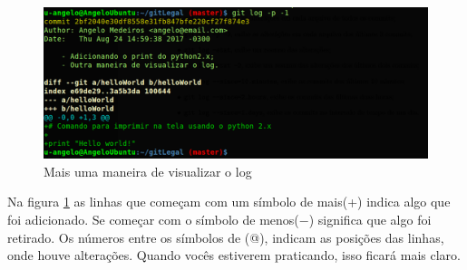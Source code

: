 \documentclass[12pt,openright,oneside,a4paper,english,brazil]{abntex2}
\begin{document}
\begin{figure}[H]
	\caption{\label{logp}Mais uma maneira de visualizar o log}
	\begin{center}
		\includegraphics[width=1\linewidth]{logp}
	\end{center}
\end{figure}

Na figura \ref{logp} as linhas que começam com um símbolo de mais(+) indica algo que foi adicionado. Se começar com o símbolo de menos($-$) significa que algo foi retirado. Os números entre os símbolos de (@), indicam as posições das linhas, onde houve alterações. Quando vocês estiverem praticando, isso ficará mais claro.

%
%
	 		
\end{document}
